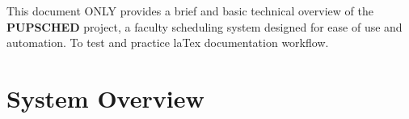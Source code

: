 \documentclass[12pt,letterpaper]{article}
\begin{document}
\coverpage 


\renewcommand{\contentsname}{\centering\sffamily\Large Table of Contents}
\renewcommand{\cftsecleader}{\cftdotfill{\cftdotsep}}

\renewcommand{\cftsecfont}{\sffamily\bfseries\color{darkgray}}
\renewcommand{\cftsecpagefont}{\sffamily\bfseries\color{darkgray}}

\renewcommand{\cftsubsecfont}{\sffamily\color{gray}}
\renewcommand{\cftsubsecpagefont}{\sffamily\color{gray}}

\renewcommand{\cftsubsubsecfont}{\sffamily\color{lightgray}}
\renewcommand{\cftsubsubsecpagefont}{\sffamily\color{lightgray}}

\setlength{\cftbeforesecskip}{8pt}

\newpage

\begin{tcolorbox}[githubnote]
This document ONLY provides a brief and basic technical overview of the \textbf{PUPSCHED} project, 
a faculty scheduling system designed for ease of use and automation. To test and practice laTex documentation workflow.
\end{tcolorbox} 

\vspace{3em} 
\section{System Overview}
\end{document}
